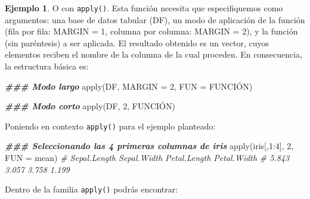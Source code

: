 \documentclass[
]{article}
\newenvironment{Shaded}{\begin{snugshade}}{\end{snugshade}}
\newcommand{\AttributeTok}[1]{\textcolor[rgb]{0.77,0.63,0.00}{#1}}
\newcommand{\CommentTok}[1]{\textcolor[rgb]{0.56,0.35,0.01}{\textit{#1}}}
\newcommand{\DecValTok}[1]{\textcolor[rgb]{0.00,0.00,0.81}{#1}}
\newcommand{\DocumentationTok}[1]{\textcolor[rgb]{0.56,0.35,0.01}{\textbf{\textit{#1}}}}
\newcommand{\FunctionTok}[1]{\textcolor[rgb]{0.00,0.00,0.00}{#1}}
\newcommand{\NormalTok}[1]{#1}
\newcommand{\SpecialCharTok}[1]{\textcolor[rgb]{0.00,0.00,0.00}{#1}}
\theoremstyle{definition}
\theoremstyle{definition}
\newtheorem{example}{Ejemplo}[section]
\theoremstyle{definition}
\theoremstyle{definition}
\theoremstyle{remark}
\begin{document}
\begin{example}
O con \texttt{apply()}. Esta función necesita que especifiquemos como argumentos: una base de datos tabular (DF), un modo de aplicación de la función (fila por fila: MARGIN = 1, columna por columna: MARGIN = 2), y la función (sin paréntesis) a ser aplicada. El resultado obtenido es un vector, cuyos elementos reciben el nombre de la columna de la cual proceden. En consecuencia, la estructura básica es:

\begin{Shaded}
\begin{Highlighting}[]
\DocumentationTok{\#\#\# Modo largo}
\FunctionTok{apply}\NormalTok{(DF, }\AttributeTok{MARGIN =} \DecValTok{2}\NormalTok{, }\AttributeTok{FUN =}\NormalTok{ FUNCIÓN)}

\DocumentationTok{\#\#\# Modo corto}
\FunctionTok{apply}\NormalTok{(DF, }\DecValTok{2}\NormalTok{, FUNCIÓN)}
\end{Highlighting}
\end{Shaded}

Poniendo en contexto \texttt{apply()} para el ejemplo planteado:

\begin{Shaded}
\begin{Highlighting}[]
\DocumentationTok{\#\#\# Seleccionando las 4 primeras columnas de iris}
\FunctionTok{apply}\NormalTok{(iris[,}\DecValTok{1}\SpecialCharTok{:}\DecValTok{4}\NormalTok{], }\DecValTok{2}\NormalTok{, }\AttributeTok{FUN =}\NormalTok{ mean)}
\CommentTok{\# Sepal.Length  Sepal.Width Petal.Length  Petal.Width }
\CommentTok{\#        5.843        3.057        3.758        1.199}
\end{Highlighting}
\end{Shaded}

\end{example}

Dentro de la familia \texttt{apply()} podrás encontrar:
\end{document}
